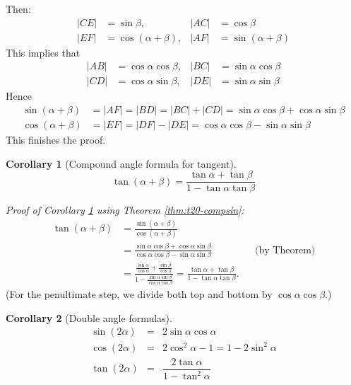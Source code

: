 \documentclass[
  english,
  12pt,
  oneside]{book}
\newtheorem{corollary}{Corollary}[chapter]
\theoremstyle{definition}
\theoremstyle{definition}
\theoremstyle{definition}
\theoremstyle{definition}
\theoremstyle{remark}
\begin{document}
Then:
\begin{align}
|CE| &= \sin\beta, & |AC| &= \cos\beta \tag{\(\triangle ACE\)}\\
|EF| &= \cos(\alpha+\beta), & |AF| &=\sin(\alpha+\beta) \tag{\(\triangle AEF\)}
\end{align}
This implies that
\begin{align}
|AB| &= \cos\alpha\cos\beta, & |BC| &= \sin\alpha\cos\beta \tag{\(\triangle ABC\)}\\
|CD| &= \cos\alpha\sin\beta, & |DE| &= \sin\alpha\sin\beta \tag{\(\triangle CDE\)}
\end{align}
Hence
\begin{align*}
\sin(\alpha+\beta) &= |AF| = |BD| = |BC|+|CD| = \sin\alpha\cos\beta+\cos\alpha\sin\beta\\
\cos(\alpha+\beta) &= |EF| = |DF| - |DE| = \cos\alpha\cos\beta - \sin\alpha\sin\beta
\end{align*}
This finishes the proof.

\begin{corollary}[Compound angle formula for tangent]
\protect\hypertarget{cor:t20-comptan}{}\label{cor:t20-comptan}\[\boxed{
  \tan(\alpha+\beta) = \frac{\tan\alpha+\tan\beta}{1-\tan\alpha\tan\beta}
}\]
\end{corollary}

\emph{Proof of Corollary \ref{cor:t20-comptan} using Theorem \ref{thm:t20-compsin}:}
\begin{align*}
\tan(\alpha+\beta) &= \frac{\sin(\alpha+\beta)}{\cos(\alpha+\beta)}\\
 &= \frac{\sin\alpha\cos\beta + \cos\alpha\sin\beta}{\cos\alpha\cos\beta - \sin\alpha\sin\beta} &&\text{(by Theorem)}\\
 &= \frac{\frac{\sin\alpha}{\cos\alpha} + \frac{\sin\beta}{\cos\beta}}{1-\frac{\sin\alpha\sin\beta}{\cos\alpha\cos\beta}}
 = \frac{\tan\alpha+\tan\beta}{1-\tan\alpha\tan\beta}.
\end{align*}
(For the penultimate step, we divide both top and bottom by \(\cos\alpha\cos\beta\).)

\begin{corollary}[Double angle formulas]
\protect\hypertarget{cor:t20-double}{}\label{cor:t20-double}\[\boxed{
\begin{array}{rcl}
\sin(2\alpha) &=& 2\sin\alpha\cos\alpha\\
\cos(2\alpha) &=& 2\cos^2\alpha - 1 = 1-2\sin^2\alpha\\
\tan(2\alpha) &=& \dfrac{2\tan\alpha}{1-\tan^2\alpha}
\end{array}
}\]
\end{corollary}
\end{document}
